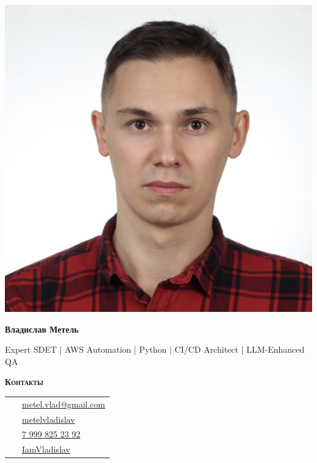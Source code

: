\documentclass[10pt, a4paper]{article}
\newcommand{\headleft}[1]{\vspace*{2ex}\textsc{\textbf{#1}}\par%
	\vspace*{-1.5ex}\hrulefill\par\vspace*{0.7ex}}
\begin{document}
	
	\setlength{\topskip}{0pt}
	\setlength{\parindent}{0pt}
	\setlength{\parskip}{0pt}
	\setlength{\fboxsep}{0pt}
	\pagestyle{empty}
	\raggedbottom
	
	\begin{minipage}[t]{0.33\textwidth} %
		\colorbox{cvblue!90}{\color{white}  %
			\textwidth\relax%
			\begin{minipage}[t][297mm][t]{0.82\textwidth}
				\raggedright
				\vspace*{2ex} %
				\null\hfill\includegraphics[height=0.85\textwidth]{avatar.jpg}\hfill\null

				
				\vspace*{1.5ex}
				
				\Large  \textbf{Владислав Метель} \normalsize 
				
				\vspace*{1.5ex}
				
				Expert SDET | AWS Automation | Python | CI/CD Architect | LLM-Enhanced QA
				
				\headleft{Контакты}
				
				\begin{tabular}{ @{}c l }
					\Letter\ & \href{mailto:metel.vlad@gmail.com?subject=Job Opportunity}{metel.vlad@gmail.com} \\
					\faLinkedin\ & \href{https://www.linkedin.com/in/metelvladislav}{metelvladislav} \\
					\faMobile*\ & \href{tel:+7 999 825 23 92}{\raisebox{0.2ex}{+}7 999 825 23 92} \\
					\faGithub\ & \href{https://github.com/IamVladislav}{IamVladislav} \\
				\end{tabular}
				

\end{minipage}}
\end{minipage}
\end{document}
